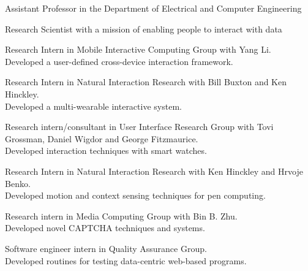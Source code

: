  {
	 {
		Assistant Professor in the Department of Electrical and Computer Engineering}
}

 {
	 {
		Research Scientist with a mission of enabling people to interact with data	}
}


 {
	 {
		Research Intern in Mobile Interactive Computing Group with Yang Li.\\
		Developed a user-defined cross-device interaction framework.
	}
}

 {
	 {
		Research Intern in Natural Interaction Research with Bill Buxton and Ken Hinckley.\\
		Developed a multi-wearable interactive system.
	}
}

 {
	 {
		Research intern/consultant in User Interface Research Group with Tovi Grossman, Daniel Wigdor and George Fitzmaurice.\\
		Developed interaction techniques with smart watches.
	}
}

 {
	 {
		Research Intern in Natural Interaction Research with Ken Hinckley and Hrvoje Benko.\\
		Developed motion and context sensing techniques for pen computing.
	}
}

 {
	 {
		Research intern in Media Computing Group with Bin B. Zhu.\\
		Developed novel CAPTCHA techniques and systems.
	}
}

 {
	 {
		Software engineer intern in Quality Assurance Group.\\
		Developed routines for testing data-centric web-based programs.
	}
}